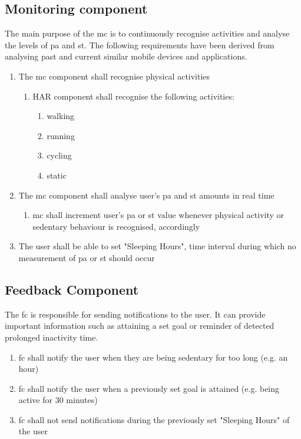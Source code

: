     
    \subsection{Monitoring component}
    The main purpose of the \gls{mc} is to continuously recognise activities and analyse the levels of \gls{pa} and \gls{st}. The following requirements have been derived from analysing past and current similar mobile devices and applications.
    
    \begin{enumerate}
        \item The \gls{mc} component shall recognise physical activities
        \begin{enumerate}
            \item HAR component shall recognise the following activities:
            \begin{enumerate}
                \item walking
                \item running
                \item cycling
                \item static
            \end{enumerate}
        \end{enumerate}
        \item The \gls{mc} component shall analyse user's \gls{pa} and \gls{st} amounts in real time
            \begin{enumerate}
                \item \gls{mc} shall increment user's \gls{pa} or \gls{st} value whenever physical activity or sedentary behaviour is recognised, accordingly
            \end{enumerate}
        \item The user shall be able to set "Sleeping Hours", time interval during which no measurement of \gls{pa} or \gls{st} should occur
      
    \end{enumerate}
    
    \subsection{Feedback Component}
    The \gls{fc} is responsible for sending notifications to the user. It can provide important information such as attaining a set goal or reminder of detected prolonged inactivity time.
    \begin{enumerate}
        \item \gls{fc} shall notify the user when they are being sedentary for too long (e.g. an hour)
        
        \item \gls{fc} shall notify the user when a previously set goal is attained (e.g. being active for 30 minutes)
        
        \item \gls{fc} shall not send notifications during the previously set "Sleeping Hours" of the user
    \end{enumerate}

